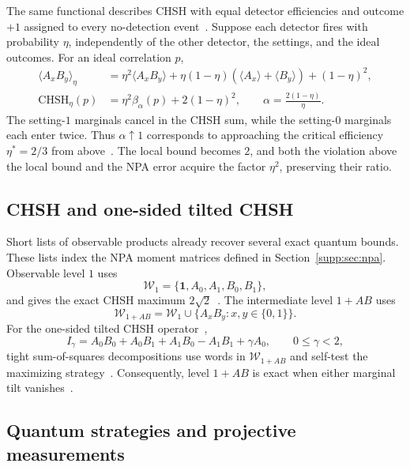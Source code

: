 \documentclass[aps,prl,onecolumn,10pt,superscriptaddress,nofootinbib,longbibliography]{revtex4-2}
\theoremstyle{remark}
\newcommand{\id}{\mathbf 1}
\begin{document}
The same functional describes CHSH with equal detector efficiencies and outcome $+1$ assigned to every no-detection event~\cite{MiklinEtAl2022,GigenaEtAl2025}. Suppose each detector fires with probability $\eta$, independently of the other detector, the settings, and the ideal outcomes. For an ideal correlation $p$,
\begin{align*}
\langle A_xB_y\rangle_\eta
&=\eta^2\langle A_xB_y\rangle
+\eta(1-\eta)(\langle A_x\rangle+\langle B_y\rangle)+(1-\eta)^2,\\
\mathrm{CHSH}_\eta(p)
&=\eta^2\beta_\alpha(p)+2(1-\eta)^2,
\qquad \alpha=\frac{2(1-\eta)}{\eta}.
\end{align*}
The setting-$1$ marginals cancel in the CHSH sum, while the setting-$0$ marginals each enter twice. Thus $\alpha\uparrow1$ corresponds to approaching the critical efficiency $\eta^*=2/3$ from above~\cite{Eberhard1993}. The local bound becomes $2$, and both the violation above the local bound and the NPA error acquire the factor $\eta^2$, preserving their ratio.

\subsection{CHSH and one-sided tilted CHSH}

Short lists of observable products already recover several exact quantum bounds. These lists index the NPA moment matrices defined in Section~\ref{supp:sec:npa}. Observable level $1$ uses
\begin{equation}
\mathcal W_1=\{\id,A_0,A_1,B_0,B_1\},
\label{supp:eq:level-one-list}
\end{equation}
and gives the exact CHSH maximum $2\sqrt2$~\cite{Tsirelson1980,NPA2007}. The intermediate level $1+AB$ uses
\begin{equation}
\mathcal W_{1+AB}=\mathcal W_1\cup\{A_xB_y:x,y\in\{0,1\}\}.
\label{supp:eq:level-one-ab-list}
\end{equation}
For the one-sided tilted CHSH operator~\cite{AMP2012},
\begin{equation}
I_\gamma=A_0B_0+A_0B_1+A_1B_0-A_1B_1+\gamma A_0,
\qquad 0\leq\gamma<2,
\label{supp:eq:one-sided-tilted}
\end{equation}
tight sum-of-squares decompositions use words in $\mathcal W_{1+AB}$ and self-test the maximizing strategy~\cite{BampsPironio2015,SupicBowles2020}. Consequently, level $1+AB$ is exact when either marginal tilt vanishes~\cite{GigenaEtAl2025}.

\subsection{Quantum strategies and projective measurements}
\end{document}
